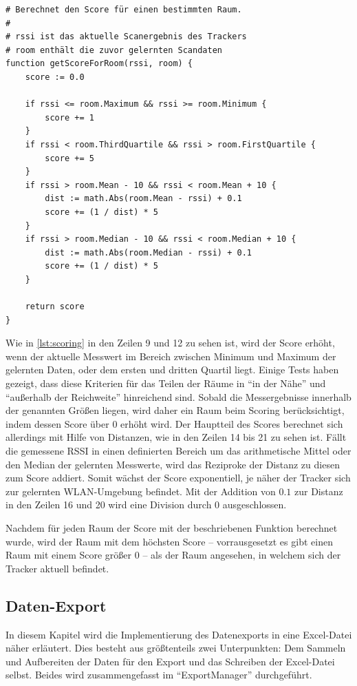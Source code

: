\begin{lstlisting}[caption={Pseudocode-Beschreibung der Scoring-Funktion},label={lst:scoring},tabsize=2]
# Berechnet den Score für einen bestimmten Raum.
#
# rssi ist das aktuelle Scanergebnis des Trackers
# room enthält die zuvor gelernten Scandaten
function getScoreForRoom(rssi, room) {
	score := 0.0

	if rssi <= room.Maximum && rssi >= room.Minimum {
		score += 1
	}
	if rssi < room.ThirdQuartile && rssi > room.FirstQuartile {
		score += 5
	}
	if rssi > room.Mean - 10 && rssi < room.Mean + 10 {
		dist := math.Abs(room.Mean - rssi) + 0.1
		score += (1 / dist) * 5
	}
	if rssi > room.Median - 10 && rssi < room.Median + 10 {
		dist := math.Abs(room.Median - rssi) + 0.1
		score += (1 / dist) * 5
	}

	return score
}
\end{lstlisting}

Wie in \autoref{lst:scoring} in den Zeilen 9 und 12 zu sehen ist, wird der Score erhöht,
wenn der aktuelle Messwert im Bereich zwischen Minimum und Maximum der gelernten Daten, oder dem
ersten und dritten Quartil liegt.
Einige Tests haben gezeigt, dass diese Kriterien für das Teilen der Räume in \enquote{in der Nähe}
und \enquote{außerhalb der Reichweite} hinreichend sind. Sobald die Messergebnisse innerhalb
der genannten Größen liegen, wird daher ein Raum beim Scoring berücksichtigt, indem dessen Score
über $0$ erhöht wird.
Der Hauptteil des Scores berechnet sich allerdings mit Hilfe von Distanzen, wie in den Zeilen 14 bis
21 zu sehen ist. Fällt die gemessene \gls{RSSI} in einen definierten Bereich um das arithmetische
Mittel oder den Median der gelernten Messwerte, wird das Reziproke der Distanz zu diesen zum Score
addiert. Somit wächst der Score exponentiell, je näher der Tracker sich zur gelernten
\gls{WLAN}-Umgebung befindet.
Mit der Addition von $0.1$ zur Distanz in den Zeilen 16 und 20 wird eine Division durch $0$
ausgeschlossen.

Nachdem für jeden Raum der Score mit der beschriebenen Funktion berechnet wurde, wird der Raum mit
dem höchsten Score -- vorrausgesetzt es gibt einen Raum mit einem Score größer $0$ -- als der Raum
angesehen, in welchem sich der Tracker aktuell befindet.

\subsection{Daten-Export}

In diesem Kapitel wird die Implementierung des Datenexports in eine Excel-Datei näher erläutert.
Dies besteht aus größtenteils zwei Unterpunkten: Dem Sammeln und Aufbereiten der Daten für den Export und das
Schreiben der Excel-Datei selbst.
Beides wird zusammengefasst im \enquote{ExportManager} durchgeführt.

